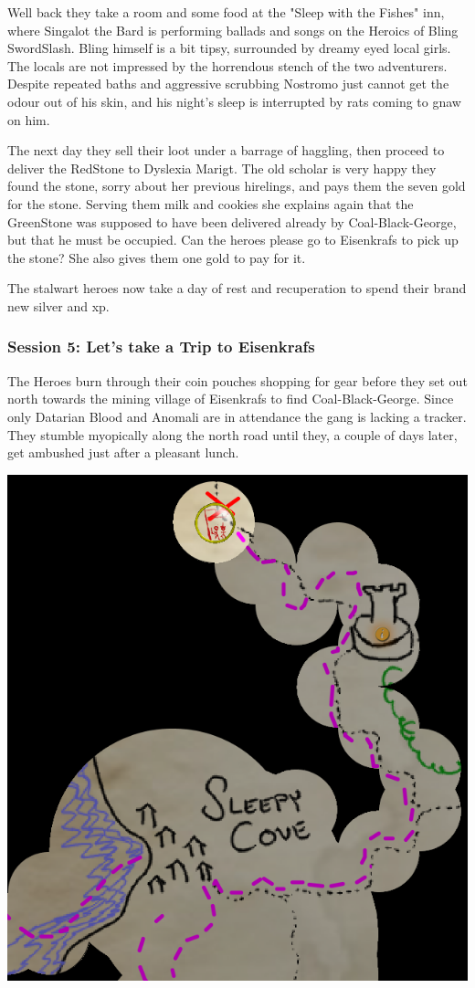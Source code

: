 Well back they take a room and some food at the "Sleep with the Fishes" inn, where Singalot the Bard is performing ballads and songs on the Heroics of Bling SwordSlash. Bling himself is a bit tipsy, surrounded by dreamy eyed local girls. The locals are not impressed by the horrendous stench of the two adventurers. Despite repeated baths and aggressive scrubbing Nostromo just cannot get the odour out of his skin, and his night's sleep is interrupted by rats coming to gnaw on him.

The next day they sell their loot under a barrage of haggling, then proceed to deliver the RedStone to Dyslexia Marigt. The old scholar is very happy they found the stone, sorry about her previous hirelings, and pays them the seven gold for the stone. Serving them milk and cookies she explains again that the GreenStone was supposed to have been delivered already by Coal-Black-George, but that he must be occupied. Can the heroes please go to Eisenkrafs to pick up the stone? She also gives them one gold to pay for it.

The stalwart heroes now take a day of rest and recuperation to spend their brand new silver and xp.


\subsubsection*{Session 5: Let's take a Trip to Eisenkrafs}
The Heroes burn through their coin pouches shopping for gear before they set out north towards the mining village of Eisenkrafs to find Coal-Black-George. Since only Datarian Blood and Anomali are in attendance the gang is lacking a tracker. They stumble myopically along the north road until they, a couple of days later, get ambushed just after a pleasant lunch.

\begin{center}
\vspace{0.5 cm}
\includegraphics[width=0.5\linewidth]{./figs/playthrough/travel-eisenkrafs.png}
\vspace{0.5 cm}
\end{center}

